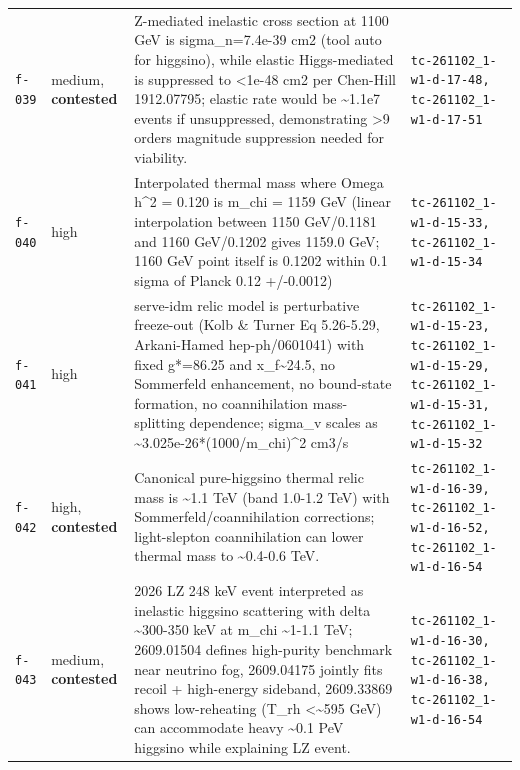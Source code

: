 \documentclass[11pt,a4paper]{article}
\begin{document}
\begin{longtable}{@{}p{}p{}p{}p{}@{}}
\texttt{f-039} & medium, \textbf{contested} & Z-mediated inelastic cross section at 1100 GeV is sigma\_n=7.4e-39 cm2 (tool auto for higgsino), while elastic Higgs-mediated is suppressed to \textless{}1e-48 cm2 per Chen-Hill 1912.07795; elastic rate would be \textasciitilde{}1.1e7 events if unsuppressed, demonstrating \textgreater{}9 orders magnitude suppression needed for viability. & \texttt{tc-261102\_\allowbreak{}1-w1-d-17-48,\allowbreak{} tc-261102\_\allowbreak{}1-w1-d-17-51} \\
\texttt{f-040} & high & Interpolated thermal mass where Omega h\textasciicircum{}2 = 0.120 is m\_chi = 1159 GeV (linear interpolation between 1150 GeV/0.1181 and 1160 GeV/0.1202 gives 1159.0 GeV; 1160 GeV point itself is 0.1202 within 0.1 sigma of Planck 0.12 +/-0.0012) & \texttt{tc-261102\_\allowbreak{}1-w1-d-15-33,\allowbreak{} tc-261102\_\allowbreak{}1-w1-d-15-34} \\
\texttt{f-041} & high & serve-idm relic model is perturbative freeze-out (Kolb \& Turner Eq 5.26-5.29, Arkani-Hamed hep-ph/0601041) with fixed g*=86.25 and x\_f\textasciitilde{}24.5, no Sommerfeld enhancement, no bound-state formation, no coannihilation mass-splitting dependence; sigma\_v scales as \textasciitilde{}3.025e-26*(1000/m\_chi)\textasciicircum{}2 cm3/s & \texttt{tc-261102\_\allowbreak{}1-w1-d-15-23,\allowbreak{} tc-261102\_\allowbreak{}1-w1-d-15-29,\allowbreak{} tc-261102\_\allowbreak{}1-w1-d-15-31,\allowbreak{} tc-261102\_\allowbreak{}1-w1-d-15-32} \\
\texttt{f-042} & high, \textbf{contested} & Canonical pure-higgsino thermal relic mass is \textasciitilde{}1.1 TeV (band 1.0-1.2 TeV) with Sommerfeld/coannihilation corrections; light-slepton coannihilation can lower thermal mass to \textasciitilde{}0.4-0.6 TeV. & \texttt{tc-261102\_\allowbreak{}1-w1-d-16-39,\allowbreak{} tc-261102\_\allowbreak{}1-w1-d-16-52,\allowbreak{} tc-261102\_\allowbreak{}1-w1-d-16-54} \\
\texttt{f-043} & medium, \textbf{contested} & 2026 LZ 248 keV event interpreted as inelastic higgsino scattering with delta \textasciitilde{}300-350 keV at m\_chi \textasciitilde{}1-1.1 TeV; 2609.01504 defines high-purity benchmark near neutrino fog, 2609.04175 jointly fits recoil + high-energy sideband, 2609.33869 shows low-reheating (T\_rh \textless{}\textasciitilde{}595 GeV) can accommodate heavy \textasciitilde{}0.1 PeV higgsino while explaining LZ event. & \texttt{tc-261102\_\allowbreak{}1-w1-d-16-30,\allowbreak{} tc-261102\_\allowbreak{}1-w1-d-16-38,\allowbreak{} tc-261102\_\allowbreak{}1-w1-d-16-54} \\

\end{longtable}
\end{document}
